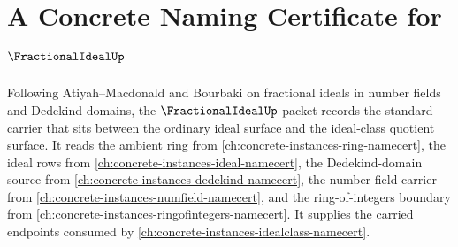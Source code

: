 \chapter{A Concrete Naming Certificate for $\FractionalIdealUp$}
\label{ch:concrete-instances-fractional-ideal-namecert}

Following Atiyah--Macdonald and Bourbaki on fractional ideals in number fields and Dedekind domains, the $\FractionalIdealUp$ packet records the standard carrier that sits between the ordinary ideal surface and the ideal-class quotient surface. It reads the ambient ring from \autoref{ch:concrete-instances-ring-namecert}, the ideal rows from \autoref{ch:concrete-instances-ideal-namecert}, the Dedekind-domain source from \autoref{ch:concrete-instances-dedekind-namecert}, the number-field carrier from \autoref{ch:concrete-instances-numfield-namecert}, and the ring-of-integers boundary from \autoref{ch:concrete-instances-ringofintegers-namecert}. It supplies the carried endpoints consumed by \autoref{ch:concrete-instances-idealclass-namecert}.

